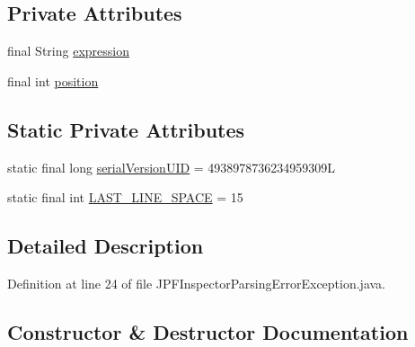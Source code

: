 \subsection*{Private Attributes}
\begin{DoxyCompactItemize}
\item 
final String \hyperlink{classgov_1_1nasa_1_1jpf_1_1inspector_1_1exceptions_1_1_j_p_f_inspector_parsing_error_exception_a534770d46b21ef3066d07b739e2340cd}{expression}
\item 
final int \hyperlink{classgov_1_1nasa_1_1jpf_1_1inspector_1_1exceptions_1_1_j_p_f_inspector_parsing_error_exception_a3b5ad5d782659c6bbe1387f4a06531bf}{position}
\end{DoxyCompactItemize}
\subsection*{Static Private Attributes}
\begin{DoxyCompactItemize}
\item 
static final long \hyperlink{classgov_1_1nasa_1_1jpf_1_1inspector_1_1exceptions_1_1_j_p_f_inspector_parsing_error_exception_a603dce023e298bc1978739f08fd2b9ac}{serial\+Version\+U\+ID} = 4938978736234959309L
\item 
static final int \hyperlink{classgov_1_1nasa_1_1jpf_1_1inspector_1_1exceptions_1_1_j_p_f_inspector_parsing_error_exception_afa19cfe2c47688fefc1f995c55a4df1a}{L\+A\+S\+T\+\_\+\+L\+I\+N\+E\+\_\+\+S\+P\+A\+CE} = 15
\end{DoxyCompactItemize}


\subsection{Detailed Description}


Definition at line 24 of file J\+P\+F\+Inspector\+Parsing\+Error\+Exception.\+java.



\subsection{Constructor \& Destructor Documentation}
